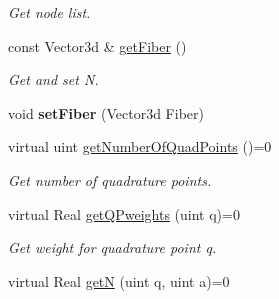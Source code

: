 \begin{DoxyCompactItemize}
\begin{DoxyCompactList}\small\item\em Get node list. \item\end{DoxyCompactList}\item 
\hypertarget{classvoom_1_1_geom_element_a3cf7dceb6da467552bd18e6433d20438}{
const Vector3d \& \hyperlink{classvoom_1_1_geom_element_a3cf7dceb6da467552bd18e6433d20438}{getFiber} ()}
\label{classvoom_1_1_geom_element_a3cf7dceb6da467552bd18e6433d20438}

\begin{DoxyCompactList}\small\item\em Get and set N. \item\end{DoxyCompactList}\item 
\hypertarget{classvoom_1_1_geom_element_a1ef6554099e2af41614a347b3acd8177}{
void {\bfseries setFiber} (Vector3d Fiber)}
\label{classvoom_1_1_geom_element_a1ef6554099e2af41614a347b3acd8177}

\item 
\hypertarget{classvoom_1_1_geom_element_aba65f5dd190d08d23f396714eba8b087}{
virtual uint \hyperlink{classvoom_1_1_geom_element_aba65f5dd190d08d23f396714eba8b087}{getNumberOfQuadPoints} ()=0}
\label{classvoom_1_1_geom_element_aba65f5dd190d08d23f396714eba8b087}

\begin{DoxyCompactList}\small\item\em Get number of quadrature points. \item\end{DoxyCompactList}\item 
\hypertarget{classvoom_1_1_geom_element_a45955cbf2475348fbdf272923eafb6ee}{
virtual Real \hyperlink{classvoom_1_1_geom_element_a45955cbf2475348fbdf272923eafb6ee}{getQPweights} (uint q)=0}
\label{classvoom_1_1_geom_element_a45955cbf2475348fbdf272923eafb6ee}

\begin{DoxyCompactList}\small\item\em Get weight for quadrature point q. \item\end{DoxyCompactList}\item 
\hypertarget{classvoom_1_1_geom_element_a5c121346fffab018f6a9a52ac7d492e9}{
virtual Real \hyperlink{classvoom_1_1_geom_element_a5c121346fffab018f6a9a52ac7d492e9}{getN} (uint q, uint a)=0}
\label{classvoom_1_1_geom_element_a5c121346fffab018f6a9a52ac7d492e9}


\end{DoxyCompactItemize}
